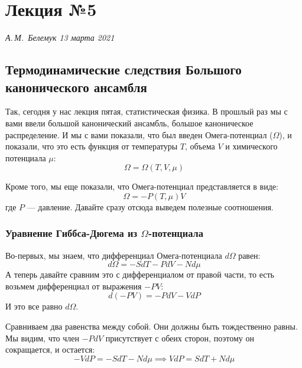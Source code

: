 \documentclass[../general/general]{subfiles}
\begin{document}
\chapter{Лекция №5}
\noindent\textit{А.\,М.~Белемук \hfill 13 марта 2021}
\vspace{1em}
\ifSubfilesClassLoaded{\tableofcontents\newpage}{}


\section{Термодинамические следствия Большого канонического ансамбля}

Так, сегодня у нас лекция пятая, статистическая физика. В прошлый раз мы с вами ввели большой канонический ансамбль, большое каноническое распределение. И мы с вами показали, что был введен Омега-потенциал ($\Omega$), и показали, что это есть функция от температуры $T$, объема $V$ и химического потенциала $\mu$:
\begin{equation}
    \Omega = \Omega(T, V, \mu)
\end{equation}

Кроме того, мы еще показали, что Омега-потенциал представляется в виде:
\begin{equation}
    \Omega = -P(T, \mu) V
\end{equation}
где $P$ — давление. Давайте сразу отсюда выведем полезные соотношения. 

\subsection{Уравнение Гиббса-Дюгема из $\Omega$-потенциала}

Во-первых, мы знаем, что дифференциал Омега-потенциала $d\Omega$ равен:
\begin{equation}
    d\Omega = -S dT - P dV - N d\mu
\end{equation}
А теперь давайте сравним это с дифференциалом от правой части, то есть возьмем дифференциал от выражения $-PV$:
\begin{equation}
    d(-PV) = -P dV - V dP
\end{equation}
И это все равно $d\Omega$. 

Сравниваем два равенства между собой. Они должны быть тождественно равны. Мы видим, что член $-P dV$ присутствует с обеих сторон, поэтому он сокращается, и остается:
\begin{equation}
    -V dP = -S dT - N d\mu \implies V dP = S dT + N d\mu
\end{equation}
\end{document}
